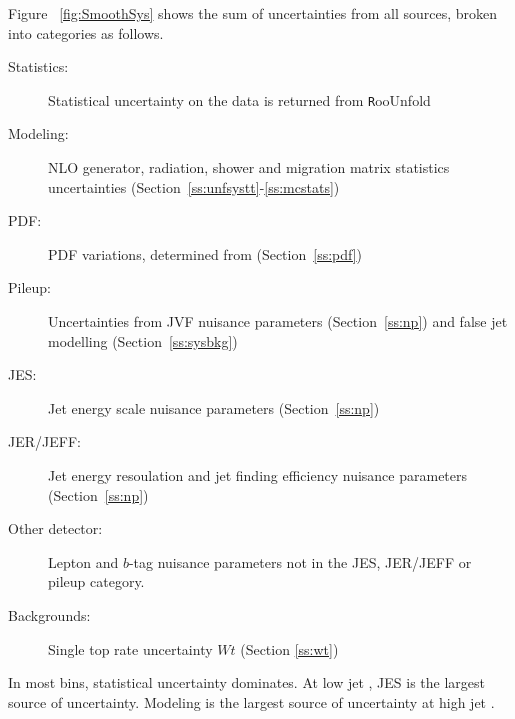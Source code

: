 Figure ~\ref{fig:SmoothSys} shows the sum of uncertainties from all sources, broken into categories as follows.
\begin{description}
\item[Statistics:] Statistical uncertainty on the data is returned from {\texttt RooUnfold}
\item[Modeling:] NLO generator, radiation, shower and migration matrix statistics uncertainties (Section~\ref{ss:unfsystt}-\ref{ss:mcstats})
\item[PDF:] PDF variations, determined from \mcnlohw (Section~\ref{ss:pdf})
\item[Pileup:] Uncertainties from JVF nuisance parameters (Section~\ref{ss:np}) and false jet modelling (Section~\ref{ss:sysbkg})
\item[JES:] Jet energy scale nuisance parameters (Section~\ref{ss:np})
\item[JER/JEFF:] Jet energy resoulation and jet finding efficiency nuisance parameters (Section~\ref{ss:np})
\item[Other detector:] Lepton and $b$-tag nuisance parameters not in the JES, JER/JEFF or pileup category.
\item[Backgrounds:] Single top rate uncertainty $Wt$ (Section \ref{ss:wt}) 
\end{description}

In most bins, statistical uncertainty dominates. At low jet \pt, JES is the largest source of uncertainty. Modeling is the largest source of uncertainty at high jet \pt.




